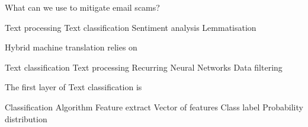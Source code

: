 \documentclass[theme=sleek, randomorder, hidesidemenu]{webquiz}
\begin{document}
\begin{question}

  What can we use to mitigate email scams?
  \begin{choice}[columns=2]
    \incorrect Text processing
    \correct Text classification
    \incorrect Sentiment analysis
    \incorrect Lemmatisation
  \end{choice}

\end{question}

\begin{question}

  Hybrid machine translation relies on
  \begin{choice}[columns=2]
    \correct Text classification
    \incorrect Text processing
    \incorrect Recurring Neural Networks
    \incorrect Data filtering
  \end{choice}

\end{question}

\begin{question}

  The first layer of Text classification is
  \begin{choice}[columns=2]
    \incorrect Classification Algorithm
    \correct Feature extract
    \incorrect Vector of features
    \incorrect Class label
    \incorrect Probability distribution
  \end{choice}

\end{question}
\end{document}
